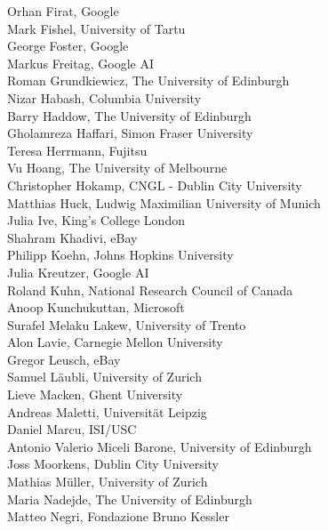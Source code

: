 \documentclass[a4paper,11pt,twoside]{book}
\begin{document}
\noindent Orhan Firat, Google\\
\noindent Mark Fishel, University of Tartu\\
\noindent George Foster, Google\\
\noindent Markus Freitag, Google AI\\
\noindent Roman Grundkiewicz, The University of Edinburgh\\
\noindent Nizar Habash, Columbia University\\
\noindent Barry Haddow, The University of Edinburgh\\
\noindent Gholamreza Haffari, Simon Fraser University\\
\noindent Teresa Herrmann, Fujitsu\\
\noindent Vu Hoang, The University of Melbourne\\
\noindent Christopher Hokamp, CNGL - Dublin City University\\
\noindent Matthias Huck, Ludwig Maximilian University of Munich\\
\noindent Julia Ive, King’s College London\\
\noindent Shahram Khadivi, eBay\\
\noindent Philipp Koehn, Johns Hopkins University\\
\noindent Julia Kreutzer, Google AI\\
\noindent Roland Kuhn, National Research Council of Canada\\
\noindent Anoop Kunchukuttan, Microsoft\\
\noindent Surafel Melaku Lakew, University of Trento\\
\noindent Alon Lavie, Carnegie Mellon University\\
\noindent Gregor Leusch, eBay\\
\noindent Samuel Läubli, University of Zurich\\
\noindent Lieve Macken, Ghent University\\
\noindent Andreas Maletti, Universität Leipzig\\
\noindent Daniel Marcu, ISI/USC\\
\noindent Antonio Valerio Miceli Barone, University of Edinburgh\\
\noindent Joss Moorkens, Dublin City University\\
\noindent Mathias Müller, University of Zurich\\
\noindent Maria Nadejde, The University of Edinburgh\\
\noindent Matteo Negri, Fondazione Bruno Kessler\\
\end{document}

